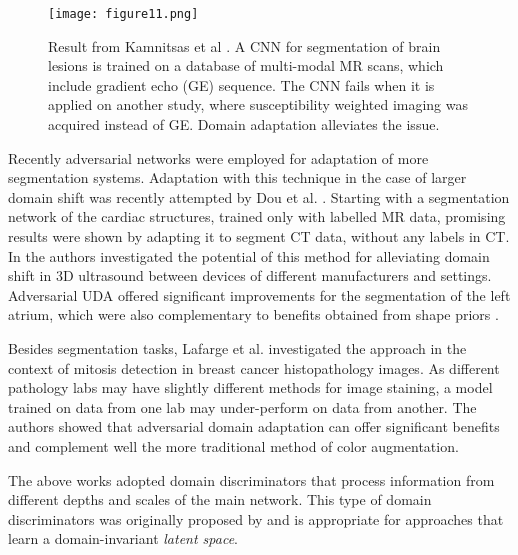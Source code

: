 \documentclass{article}
\begin{document}
\begin{figure}[tp]
\centering
\texttt{[image: figure11.png]}
\caption{Result from Kamnitsas et al \cite{kamnitsas2017unsupervised}. A CNN for segmentation of brain lesions is trained on a database of multi-modal MR scans, which include gradient echo (GE) sequence. The CNN fails when it is applied on another study, where susceptibility weighted imaging was acquired instead of GE. Domain adaptation alleviates the issue.}
\label{fig:uda_visuals}
\end{figure}

Recently adversarial networks were employed for adaptation of more segmentation systems. Adaptation with this technique in the case of larger domain shift was recently attempted by Dou et al. \cite{dou2018unsupervised}.
Starting with a segmentation network of the cardiac structures, trained only with labelled MR data, promising results were shown by adapting it to segment CT data, without any labels in CT. In \cite{degel2018domain} the authors investigated the potential of this method for alleviating domain shift in 3D ultrasound between devices of different manufacturers and settings. Adversarial UDA offered significant improvements for the segmentation of the left atrium, which were also complementary to benefits obtained from shape priors \cite{oktay2018anatomically}.

Besides segmentation tasks, Lafarge et al. \cite{lafarge2017domain} investigated the approach in the context of mitosis detection in breast cancer histopathology images. 
As different pathology labs may have slightly different methods for image staining, a model trained on data from one lab may under-perform on data from another. The authors showed that adversarial domain adaptation can offer significant benefits and complement well the more traditional method of color augmentation.

The above works \cite{lafarge2017domain,dou2018unsupervised,degel2018domain} adopted domain discriminators that process information from different depths and scales of the main network. 
This type of domain discriminators was originally proposed by \cite{kamnitsas2017unsupervised} and is appropriate for approaches that learn a domain-invariant \emph{latent space}.
\end{document}
